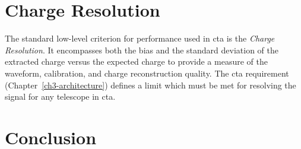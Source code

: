 

\section{Charge Resolution}

The standard low-level criterion for performance used in \gls{cta} is the \textit{Charge Resolution}. It encompasses both the bias and the standard deviation of the extracted charge versus the expected charge to provide a measure of the waveform, calibration, and charge reconstruction quality. The \gls{cta} requirement  (Chapter~\ref{ch3-architecture}) defines a limit which must be met for resolving the signal for any telescope in \gls{cta}.



\section{Conclusion}